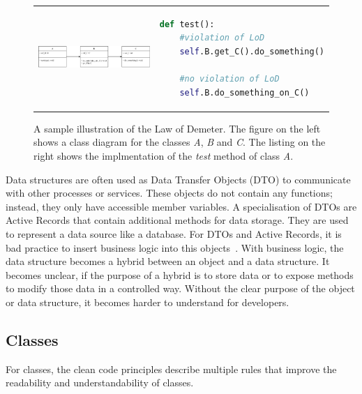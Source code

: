 \begin{figure}
\begin{tabular}{p{}p{}}
    \begin{minipage}{0.45\textwidth}
        \centering
    \includegraphics[width=\linewidth]{img/Background/LawOfDemeterUML.pdf}
    \label{fig:background_control_flow_graph_image}
    \end{minipage}
&
\begin{minipage}[c]{0.45\textwidth}
\centering
\begin{lstlisting}[language=Python, label=lst:background_control_flow_graph_listing]
def test():
    #violation of LoD
    self.B.get_C().do_something()

    #no violation of LoD
    self.B.do_something_on_C()
\end{lstlisting}
\end{minipage}
\end{tabular}
\caption[Illustration Law of Demeter]{A sample illustration of the Law of Demeter. The figure on the left shows a class diagram for the classes \textit{A}, \textit{B} and \textit{C}. The listing on the right shows the implmentation of the \textit{test} method of class \textit{A}.  }
\label{fig:LoD}
\end{figure}



Data structures are often used as Data Transfer Objects (DTO) to communicate with other processes or services. These objects do not contain any functions; instead, they only have accessible member variables. A specialisation of DTOs are Active Records that contain additional methods for data storage. They are used to represent a data source like a database. For DTOs and Active Records, it is bad practice to insert business logic into this objects~\cite{martin_clean_2009}. With business logic, the data structure becomes a hybrid between an object and a data structure. It becomes unclear, if the purpose of a hybrid is to store data or to expose methods to modify those data in a controlled way. Without the clear purpose of the object or data structure, it becomes harder to understand for developers.


\subsection{Classes}\label{sec:classes}
For classes, the clean code principles describe multiple rules that improve the readability and understandability of classes.

